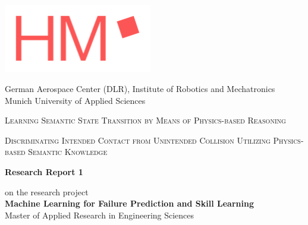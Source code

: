 \begin{center}


\begin{center}
\hspace{3cm}
\includegraphics[height=3cm]{HM-logo.png}
\end{center}



\begin{center}
German Aerospace Center (DLR), Institute of Robotics and Mechatronics \\
Munich University of Applied Sciences \\
\end{center}
\vspace{1.5cm}
\noindent\hrulefill
\begin{center}
	\LARGE{\textsc{
			Learning Semantic State Transition by Means of Physics-based Reasoning
	}}
\end{center}
\vspace{0.1cm}
\begin{center}
	\textsc{
		Discriminating Intended Contact from Unintended Collision Utilizing Physics-based Semantic Knowledge
	}
\end{center}
\noindent\hrulefill
\vspace{1cm}

\begin{center}
	\textbf{\Large{Research Report 1}}
\end{center}


\begin{center}
	on the research project \\
	\large{\textbf{Machine Learning for Failure Prediction and Skill Learning}} \\
	\small{Master of Applied Research in Engineering Sciences}
\end{center}


\end{center}

